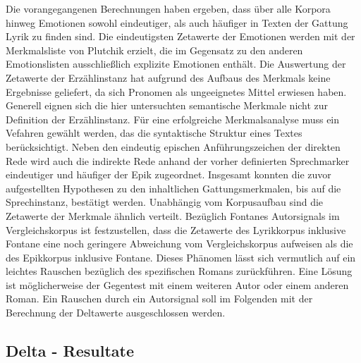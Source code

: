 \documentclass[a4paper,10p]{article}
\begin{document}
Die vorangegangenen Berechnungen haben ergeben, dass über alle Korpora hinweg Emotionen sowohl eindeutiger, als auch häufiger in Texten der Gattung Lyrik zu finden sind. Die eindeutigsten Zetawerte der Emotionen werden mit der Merkmalsliste von Plutchik erzielt, die im Gegensatz zu den anderen Emotionslisten ausschließlich explizite Emotionen enthält. Die Auswertung der Zetawerte der Erzählinstanz hat aufgrund des Aufbaus des Merkmals keine Ergebnisse geliefert, da sich Pronomen als ungeeignetes Mittel erwiesen haben. Generell eignen sich die hier untersuchten semantische Merkmale nicht zur Definition der Erzählinstanz. Für eine erfolgreiche Merkmalsanalyse muss ein Vefahren gewählt werden, das die syntaktische Struktur eines Textes berücksichtigt. Neben den eindeutig epischen Anführungszeichen der direkten Rede wird auch die indirekte Rede anhand der vorher definierten Sprechmarker eindeutiger und häufiger der Epik zugeordnet. Insgesamt konnten die zuvor aufgestellten Hypothesen zu den inhaltlichen Gattungsmerkmalen, bis auf die Sprechinstanz, bestätigt werden. Unabhängig vom Korpusaufbau sind die Zetawerte der Merkmale ähnlich verteilt. Bezüglich Fontanes Autorsignals im Vergleichskorpus ist festzustellen, dass die Zetawerte des Lyrikkorpus inklusive Fontane eine noch geringere Abweichung vom Vergleichskorpus aufweisen als die des Epikkorpus inklusive Fontane. Dieses Phänomen lässt sich vermutlich auf ein leichtes Rauschen bezüglich des spezifischen Romans zurückführen. Eine Lösung ist möglicherweise der Gegentest mit einem weiteren Autor oder einem anderen Roman. Ein Rauschen durch ein Autorsignal soll im Folgenden mit der Berechnung der Deltawerte ausgeschlossen werden.


\subsection{Delta - Resultate}
\end{document}
